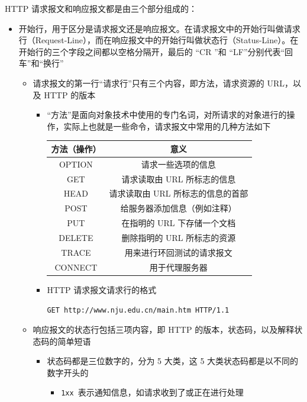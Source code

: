 \documentclass[cs4size,a4paper,10pt]{ctexart}
\begin{document}
	HTTP 请求报文和响应报文都是由三个部分组成的：
	\begin{itemize}
		\item 开始行，用于区分是请求报文还是响应报文。在请求报文中的开始行叫做请求行（Request-Line），而在响应报文中的开始行叫做状态行（Status-Line）。在开始行的三个字段之间都以空格分隔开，最后的 “CR ”和 “LF”分别代表“回车”和“换行”
		\begin{itemize}
			\item 请求报文的第一行“请求行”只有三个内容，即方法，请求资源的 URL，以及 HTTP 的版本
			\begin{itemize}
				\item “方法”是面向对象技术中使用的专门名词，对所请求的对象进行的操作，实际上也就是一些命令，请求报文中常用的几种方法如下
				\begin{table}[H]
					\centering
					\begin{tabular}{|c|c|}
					\hline
					方法（操作）  & 意义                  \\ \hline
					OPTION  & 请求一些选项的信息           \\ \hline
					GET     & 请求读取由 URL 所标志的信息    \\ \hline
					HEAD    & 请求读取由 URL 所标志的信息的首部 \\ \hline
					POST    & 给服务器添加信息（例如注释）      \\ \hline
					PUT     & 在指明的 URL 下存储一个文档    \\ \hline
					DELETE  & 删除指明的 URL 所标志的资源    \\ \hline
					TRACE   & 用来进行环回测试的请求报文       \\ \hline
					CONNECT & 用于代理服务器             \\ \hline
					\end{tabular}
				\end{table}
				\item HTTP 请求报文请求行的格式
				\begin{center}
					\verb|GET http://www.nju.edu.cn/main.htm HTTP/1.1|
				\end{center}
			\end{itemize}
			\item 响应报文的状态行包括三项内容，即 HTTP 的版本，状态码，以及解释状态码的简单短语
			\begin{itemize}
				\item 状态码都是三位数字的，分为 5 大类，这 5 大类状态码都是以不同的数字开头的
				\begin{itemize}
					\item \verb|1xx|\ 表示通知信息，如请求收到了或正在进行处理

\end{itemize}
\end{itemize}
\end{itemize}
\end{itemize}
\end{document}
